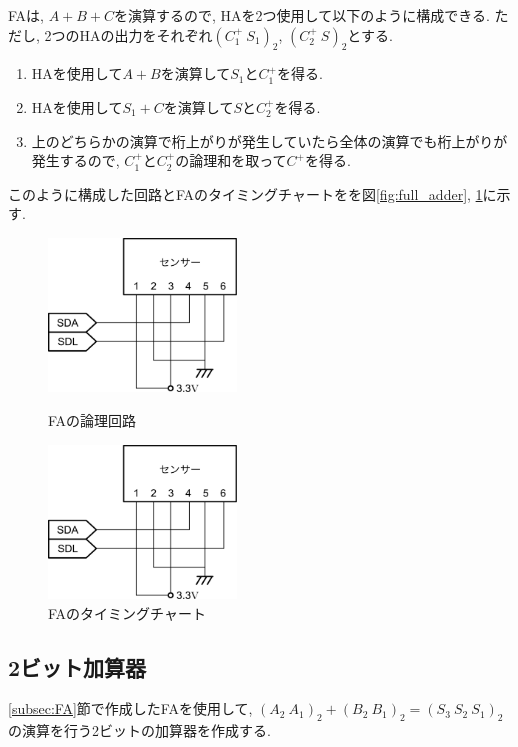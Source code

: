 \documentclass[titlepage]{jsarticle}
\begin{document}
    FAは, $A + B + C$を演算するので, HAを2つ使用して以下のように構成できる.
    ただし, 2つのHAの出力をそれぞれ$(C_1^+ \ S_1)_2$, $(C_2^+ \ S)_2$とする.
    \begin{enumerate}
      \item HAを使用して$A + B$を演算して$S_1$と$C_1^+$を得る.
      \item HAを使用して$S_1 + C$を演算して$S$と$C_2^+$を得る.
      \item 上のどちらかの演算で桁上がりが発生していたら全体の演算でも桁上がりが発生するので,
        $C_1^+$と$C_2^+$の論理和を取って$C^+$を得る.
    \end{enumerate}
    このように構成した回路とFAのタイミングチャートをを図\ref{fig:full_adder},
    \ref{fig:full_adder_timing}に示す.
    \begin{figure}[h]
      \begin{minipage}{0.45\hsize}
        \centering
        \includegraphics[width=5cm]{images/haisen.pdf}
        \caption{FAの論理回路}
        \label{fig:full_adder}
      \end{minipage}
      \begin{minipage}{0.45\hsize}
        \centering
        \includegraphics[width=5cm]{images/haisen.pdf}
        \caption{FAのタイミングチャート}
        \label{fig:full_adder_timing}
      \end{minipage}
    \end{figure}
  \subsection{2ビット加算器}
    \ref{subsec:FA}節で作成したFAを使用して, $(A_2 \ A_1)_2 + (B_2 \ B_1)_2 = (S_3 \ S_2 \ S_1)_2$
    の演算を行う2ビットの加算器を作成する.
\end{document}
